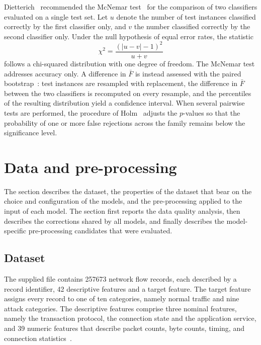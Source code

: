 Dietterich~\cite{dietterich1998} recommended the McNemar
test~\cite{mcnemar1947} for the comparison of two classifiers evaluated on a
single test set. Let $u$ denote the number of test instances classified
correctly by the first classifier only, and $v$ the number classified
correctly by the second classifier only. Under the null hypothesis of equal
error rates, the statistic
\begin{equation}
\chi^2 = \frac{\left(|u - v| - 1\right)^2}{u + v}
\label{eq:mcnemar}
\end{equation}
follows a chi-squared distribution with one degree of freedom. The McNemar
test addresses accuracy only. A difference in $\bar{F}$ is instead assessed
with the paired bootstrap~\cite{efron1993}: test instances are resampled
with replacement, the difference in $\bar{F}$ between the two classifiers is
recomputed on every resample, and the percentiles of the resulting
distribution yield a confidence interval. When several pairwise tests are
performed, the procedure of Holm~\cite{holm1979} adjusts the $p$-values so
that the probability of one or more false rejections across the family
remains below the significance level.

\section{Data and pre-processing}
\label{sec:data}

The section describes the dataset, the properties of the dataset that bear on
the choice and configuration of the models, and the pre-processing applied
to the input of each model. The section first reports the data quality
analysis, then describes the corrections shared by all models, and finally
describes the model-specific pre-processing candidates that were evaluated.

\subsection{Dataset}
\label{sec:dataset}

The supplied file contains \num{257673} network flow records, each described
by a record identifier, 42 descriptive features and a target feature. The
target feature assigns every record to one of ten categories, namely normal
traffic and nine attack categories. The descriptive features comprise three
nominal features, namely the transaction protocol, the connection state and
the application service, and 39 numeric features that describe packet counts,
byte counts, timing, and connection statistics~\cite{moustafa2016}.

